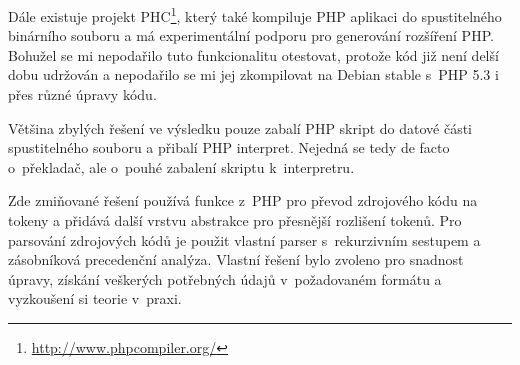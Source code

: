 \documentclass[czech]{ExcelAtFIT}
\begin{document}

		Dále existuje projekt PHC\footnote{\url{http://www.phpcompiler.org/}}, který také kompiluje PHP aplikaci do spustitelného binárního souboru a má experimentální podporu pro generování rozšíření PHP. Bohužel se mi nepodařilo tuto funkcionalitu otestovat, protože kód již není delší dobu udržován a nepodařilo se mi jej zkompilovat na Debian stable s~PHP 5.3 i přes různé úpravy kódu.


		Většina zbylých řešení ve výsledku pouze zabalí PHP skript do datové části spustitelného souboru a přibalí PHP interpret. Nejedná se tedy de facto o~pře\-kla\-dač, ale o~pouhé zabalení skriptu k~interpretru.



		Zde zmiňované řešení používá funkce z~PHP pro převod zdrojového kódu na tokeny a přidává další vrstvu abstrakce pro přesnější rozlišení tokenů. Pro parsování zdrojových kódů je použit vlastní parser s~rekurzivním sestupem a zásobníková precedenční analýza. Vlastní řešení bylo zvoleno pro snadnost úpravy, získání veškerých potřebných údajů v~po\-ža\-do\-va\-ném formátu a vyzkoušení si teorie v~praxi.
\end{document}
